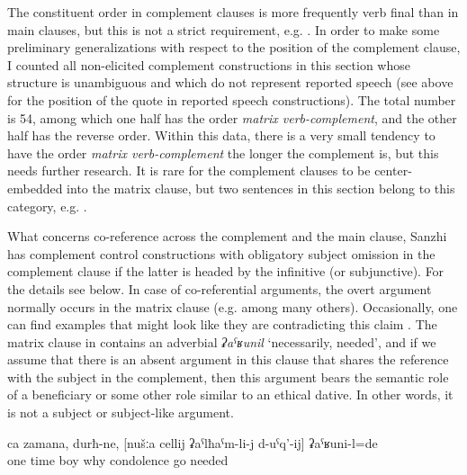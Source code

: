 The constituent order in complement clauses is more frequently verb final than in main clauses, but this is not a strict requirement, e.g. . In order to make some preliminary generalizations with respect to the position of the complement clause, I counted all non-elicited complement constructions in this section whose structure is unambiguous and which do not represent reported speech (see  above for the position of the quote in reported speech constructions). The total number is 54, among which one half has the order \textit{matrix verb-complement}, and the other half has the reverse order. Within this data, there is a very small tendency to have the order \textit{matrix verb-complement} the longer the complement is, but this needs further research. It is rare for the complement clauses to be center-embedded into the matrix clause, but two sentences in this section belong to this category, e.g. .

What concerns co-reference across the complement and the main clause, Sanzhi has complement control constructions with obligatory subject omission in the complement clause if the latter is headed by the infinitive (or subjunctive). For the details see  below. In case of co-referential arguments, the overt argument normally occurs in the matrix clause (e.g.  among many others). Occasionally, one can find examples that might look like they are contradicting this claim . The matrix clause in  contains an adverbial \textit{ʡaˁʁunil} `necessarily, needed', and if we assume that there is an absent argument in this clause that shares the reference with the subject in the complement, then this argument bears the semantic role of a beneficiary or some other role similar to an ethical dative. In other words, it is not a subject or subject-like argument.
%
\begin{exe}
	\ex	\label{ex:‎‎‎One time, guys, we had for some reason to go to say condolences}
	\gll	ca	zamana,	durħ-ne,	[nušːa	cellij	ʡaˁlħaˁm-li-j	d-uˁq'-ij]	ʡaˁʁuni-l=de\\
		one	time		boy		why	condolence	go	needed\\
	\glt	{}
\end{exe}

